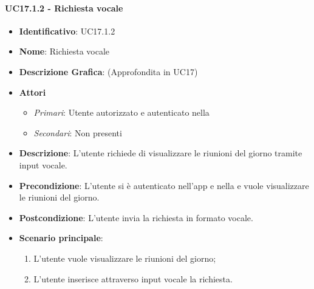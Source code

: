 \paragraph{UC17.1.2 - Richiesta vocale }
\begin{itemize}
	\item \textbf{Identificativo}: UC17.1.2
	\item \textbf{Nome}: Richiesta vocale
	\item\textbf{Descrizione Grafica}: (Approfondita in UC17)
	\item \textbf{Attori}
	\begin{itemize} 
		\item \textit{Primari}: Utente autorizzato e autenticato nella 
		\item \textit{Secondari}: Non presenti
	\end{itemize}
	\item \textbf{Descrizione}: L'utente richiede di visualizzare le riunioni del giorno tramite input vocale.
	\item \textbf{Precondizione}: L'utente si è autenticato nell'app e nella  e vuole visualizzare le riunioni del giorno.
	\item \textbf{Postcondizione}: L'utente invia la richiesta in formato vocale.
	\item \textbf{Scenario principale}:
	\begin{enumerate}
		\item L'utente vuole visualizzare le riunioni del giorno;
		\item L'utente inserisce attraverso input vocale la richiesta.
	\end{enumerate}
\end{itemize}

